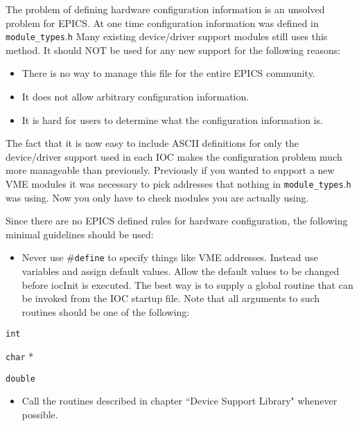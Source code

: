 The problem of defining hardware configuration information is an unsolved problem for EPICS. At one time 
configuration information was defined in \verb|module_types|.\verb|h| Many existing device/driver support modules still uses this 
method. It should NOT be used for any new support for the following reasons:

\begin{itemize}\item There is no way to manage this file for the entire EPICS community.

\item It does not allow arbitrary configuration information.

\item It is hard for users to determine what the configuration information is.

\end{itemize}The fact that it is now easy to include ASCII definitions for only the device/driver support used in each IOC makes the 
configuration problem much more manageable than previously. Previously if you wanted to support a new VME modules 
it was necessary to pick addresses that nothing in \verb|module_types|.\verb|h| was using. Now you only have to check modules 
you are actually using.

Since there are no EPICS defined rules for hardware configuration, the following minimal guidelines should be used:

\begin{itemize}\item Never use \#\verb|define| to specify things like VME addresses. Instead use variables and assign default values. Allow 
the default values to be changed before iocInit is executed. The best way is to supply a global routine that can be 
invoked from the IOC startup file. Note that all arguments to such routines should be one of the following:

\end{itemize}\verb|int|

\verb|char| *

\verb|double|

\begin{itemize}\item Call the routines described in chapter ``Device Support Library" whenever possible.

\end{itemize}






